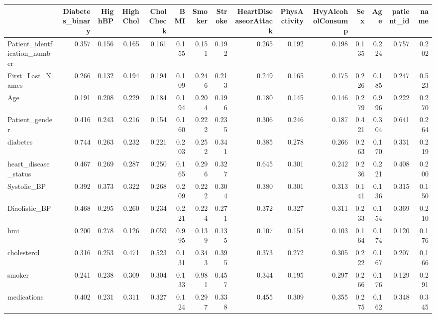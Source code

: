 \begin{tabular}{lrrrrrrrrrrrrrr}
\toprule
 & Diabetes_binary & HighBP & HighChol & CholCheck & BMI & Smoker & Stroke & HeartDiseaseorAttack & PhysActivity & HvyAlcoholConsump & Sex & Age & patient_id & name \\
\midrule
Patient_identfication_number & 0.357 & 0.156 & 0.165 & 0.161 & 0.155 & 0.151 & 0.192 & 0.265 & 0.192 & 0.198 & 0.135 & 0.224 & 0.757 & 0.202 \\
First_Last_Names & 0.266 & 0.132 & 0.194 & 0.194 & 0.109 & 0.246 & 0.213 & 0.249 & 0.165 & 0.175 & 0.226 & 0.185 & 0.247 & 0.523 \\
Age & 0.191 & 0.208 & 0.229 & 0.184 & 0.194 & 0.204 & 0.196 & 0.180 & 0.145 & 0.146 & 0.279 & 0.996 & 0.222 & 0.270 \\
Patient_gender & 0.416 & 0.243 & 0.216 & 0.154 & 0.160 & 0.222 & 0.235 & 0.306 & 0.246 & 0.187 & 0.421 & 0.304 & 0.641 & 0.264 \\
diabetes & 0.744 & 0.263 & 0.232 & 0.221 & 0.203 & 0.252 & 0.341 & 0.385 & 0.278 & 0.266 & 0.263 & 0.170 & 0.331 & 0.219 \\
heart_disease_status & 0.467 & 0.269 & 0.287 & 0.250 & 0.165 & 0.296 & 0.327 & 0.645 & 0.301 & 0.242 & 0.236 & 0.221 & 0.408 & 0.200 \\
Systolic_BP & 0.392 & 0.373 & 0.322 & 0.268 & 0.209 & 0.222 & 0.304 & 0.380 & 0.301 & 0.313 & 0.141 & 0.136 & 0.315 & 0.150 \\
Diaolistic_BP & 0.468 & 0.295 & 0.260 & 0.234 & 0.221 & 0.224 & 0.271 & 0.372 & 0.327 & 0.311 & 0.233 & 0.154 & 0.369 & 0.210 \\
bmi & 0.200 & 0.278 & 0.126 & 0.059 & 0.995 & 0.139 & 0.135 & 0.107 & 0.154 & 0.103 & 0.164 & 0.174 & 0.120 & 0.176 \\
cholesterol & 0.316 & 0.253 & 0.471 & 0.523 & 0.131 & 0.343 & 0.395 & 0.373 & 0.272 & 0.305 & 0.222 & 0.167 & 0.207 & 0.166 \\
smoker & 0.241 & 0.238 & 0.309 & 0.304 & 0.133 & 0.981 & 0.457 & 0.344 & 0.195 & 0.297 & 0.266 & 0.176 & 0.129 & 0.291 \\
medications & 0.402 & 0.231 & 0.311 & 0.327 & 0.124 & 0.297 & 0.338 & 0.455 & 0.309 & 0.355 & 0.275 & 0.162 & 0.348 & 0.345 \\
\bottomrule
\end{tabular}
